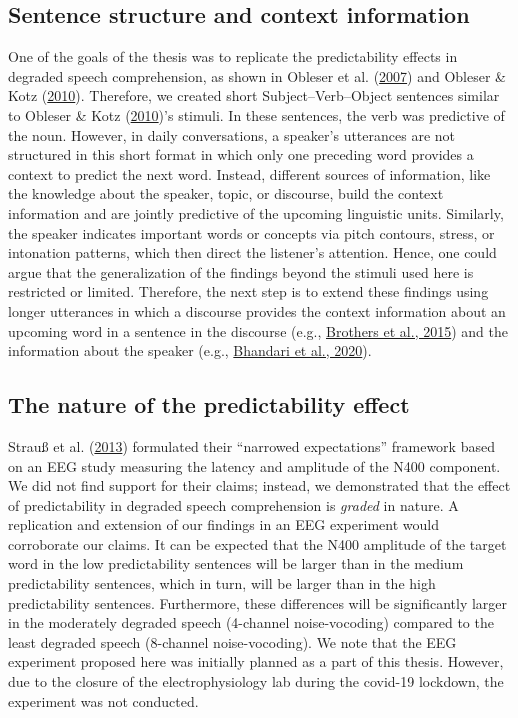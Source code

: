 \documentclass[a4paper, nobind]{templates/ociamthesis}
\begin{document}
\hypertarget{sentence-structure-and-context-information}{%
\subsection{Sentence structure and context information}\label{sentence-structure-and-context-information}}

One of the goals of the thesis was to replicate the predictability effects in degraded speech comprehension, as shown in Obleser et al. (\protect\hyperlink{ref-Obleser2007}{2007}) and Obleser \& Kotz (\protect\hyperlink{ref-Obleser2010}{2010}).
Therefore, we created short Subject--Verb--Object sentences similar to Obleser \& Kotz (\protect\hyperlink{ref-Obleser2010}{2010})'s stimuli.
In these sentences, the verb was predictive of the noun.
However, in daily conversations, a speaker's utterances are not structured in this short format in which only one preceding word provides a context to predict the next word.
Instead, different sources of information, like the knowledge about the speaker, topic, or discourse, build the context information and are jointly predictive of the upcoming linguistic units.
Similarly, the speaker indicates important words or concepts via pitch contours, stress, or intonation patterns,
which then direct the listener's attention.
Hence, one could argue that the generalization of the findings beyond the stimuli used here is restricted or limited.
Therefore, the next step is to extend these findings using longer utterances in which a discourse provides the context information about an upcoming word in a sentence in the discourse (e.g., \protect\hyperlink{ref-Brothers2015}{Brothers et al., 2015})
and the information about the speaker (e.g., \protect\hyperlink{ref-Bhandari2020}{Bhandari et al., 2020}).

\hypertarget{the-nature-of-the-predictability-effect}{%
\subsection{The nature of the predictability effect}\label{the-nature-of-the-predictability-effect}}

Strauß et al. (\protect\hyperlink{ref-Strauss2013}{2013}) formulated their ``narrowed expectations'' framework based on an EEG study measuring the latency and amplitude of the N400 component.
We did not find support for their claims;
instead, we demonstrated that the effect of predictability in degraded speech comprehension is \emph{graded} in nature.
A replication and extension of our findings in an EEG experiment would corroborate our claims.
It can be expected that the N400 amplitude of the target word in the low predictability sentences will be larger than in the medium predictability sentences, which in turn, will be larger than in the high predictability sentences.
Furthermore, these differences will be significantly larger in the moderately degraded speech (4-channel noise-vocoding) compared to the least degraded speech (8-channel noise-vocoding).
We note that the EEG experiment proposed here was initially planned as a part of this thesis.
However, due to the closure of the electrophysiology lab during the covid-19 lockdown, the experiment was not conducted.
\end{document}
